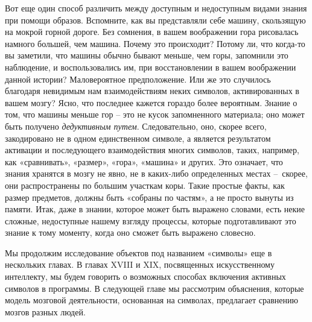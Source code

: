 \documentclass[../main.tex]{subfiles}
\begin{document}
Вот еще один способ различить между доступным и недоступным видами знания при помощи образов. Вспомните, как вы представляли себе машину, скользящую на мокрой горной дороге. Без сомнения, в вашем воображении гора рисовалась намного большей, чем машина. Почему это происходит? Потому ли, что когда-то вы заметили, что машины обычно бывают меньше, чем горы, запомнили это наблюдение, и воспользовались им, при восстановлении в вашем воображении данной истории? Маловероятное предположение. Или же это случилось благодаря невидимым нам взаимодействиям неких символов, активированных в вашем мозгу? Ясно, что последнее кажется гораздо более вероятным. Знание о том, что машины меньше гор \--- это не кусок запомненного материала; оно может быть получено \emph{дедуктивным путем}. Следовательно, оно, скорее всего, закодировано не в одном единственном символе, а является результатом активации и последующего взаимодействия многих символов, таких, например, как «сравнивать», «размер», «гора», «машина» и других. Это означает, что знания хранятся в мозгу не явно, не в каких-либо определенных местах \---~скорее, они распространены по большим участкам коры. Такие простые факты, как размер предметов, должны быть «собраны по частям», а не просто вынуты из памяти. Итак, даже в знании, которое может быть выражено словами, есть некие сложные, недоступные нашему взгляду процессы, которые подготавливают это знание к тому моменту, когда оно сможет быть выражено словесно.

Мы продолжим исследование объектов под названием «символы» еще в нескольких главах. В главах XVIII и XIX, посвященных искусственному интеллекту, мы будем говорить о возможных способах включения активных символов в программы. В следующей главе мы рассмотрим объяснения, которые модель мозговой деятельности, основанная на символах, предлагает сравнению мозгов разных людей.
\end{document}
